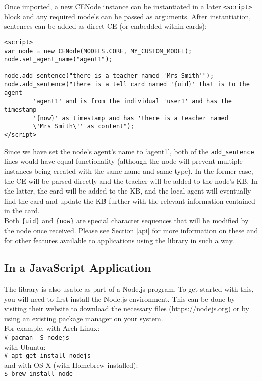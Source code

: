 \documentclass{scrartcl}
\begin{document}
Once imported, a new CENode instance can be instantiated in a later \texttt{<script>} block and any required models can be passed as arguments. After instantiation, sentences can be added as direct CE (or embedded within cards):
\begin{verbatim}
<script>
var node = new CENode(MODELS.CORE, MY_CUSTOM_MODEL);
node.set_agent_name("agent1");

node.add_sentence("there is a teacher named 'Mrs Smith'");
node.add_sentence("there is a tell card named '{uid}' that is to the agent 
        'agent1' and is from the individual 'user1' and has the timestamp 
        '{now}' as timestamp and has 'there is a teacher named 
        \'Mrs Smith\'' as content");
</script>
\end{verbatim}

Since we have set the node's agent's name to `agent1', both of the \texttt{add\_sentence} lines would have equal functionality (although the node will prevent multiple instances being created with the same name and same type). In the former case, the CE will be parsed directly and the teacher will be added to the node's KB. In the latter, the card will be added to the KB, and the local agent will eventually find the card and update the KB further with the relevant information contained in the card.\\

Both \texttt{\{uid\}} and \texttt{\{now\}} are special character sequences that will be modified by the node once received. Please see Section \ref{api} for more information on these and for other features available to applications using the library in such a way.

\subsection{In a JavaScript Application}
\label{as_an_app}
The library is also usable as part of a Node.js program. To get started with this, you will need to first install the Node.js environment. This can be done by visiting their website to download the necessary files (https://nodejs.org) or by using an existing package manager on your system.\\
For example, with Arch Linux:\\
\texttt{\# pacman -S nodejs}\\
with Ubuntu:\\
\texttt{\# apt-get install nodejs}\\
and with OS X (with Homebrew installed):\\
\texttt{\$ brew install node}\\
\end{document}
